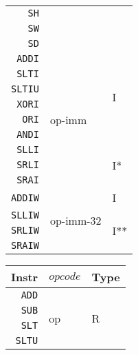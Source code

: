 \begin{table}
\begin{tabular}[t]{r|l|l}
        \texttt{SH}    &                                                   \\
        \texttt{SW}    &                                                   \\
        \texttt{SD}    &                                                   \\
        \hline
        \texttt{ADDI}  & \multirow{9}{*}{op-imm}    & \multirow{6}{*}{I}   \\
        \texttt{SLTI}  &                                                   \\
        \texttt{SLTIU} &                                                   \\
        \texttt{XORI}  &                                                   \\
        \texttt{ORI}   &                                                   \\
        \texttt{ANDI}  &                                                   \\
        \cline{3-3}
        \texttt{SLLI}  &                            & \multirow{3}{*}{I*}  \\
        \texttt{SRLI}  &                                                   \\
        \texttt{SRAI}  &                                                   \\
        \hline
        \texttt{ADDIW} & \multirow{4}{*}{op-imm-32} & I                    \\
        \cline{3-3}
        \texttt{SLLIW} &                            & \multirow{3}{*}{I**} \\
        \texttt{SRLIW} &                                                   \\
        \texttt{SRAIW} &                                                   \\
        \hline
    \end{tabular}
    \begin{tabular}[t]{r|l|l}
        \hline
        Instr         & $opcode$               & Type               \\
        \hline
        \texttt{ADD}  & \multirow{9}{*}{op}    & \multirow{9}{*}{R} \\
        \texttt{SUB}  &                                             \\
        \texttt{SLT}  &                                             \\
        \texttt{SLTU} &                                             \\

\end{tabular}
\end{table}
